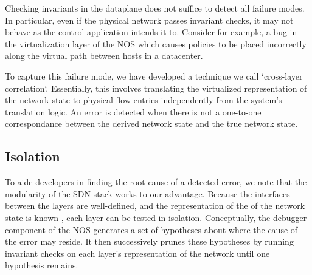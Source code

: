 Checking invariants in the dataplane does not suffice to detect all failure modes. In
particular, even if the physical network passes invariant checks, it may not behave as
the control application intends it to. Consider for example, a bug in the
virtualization layer of the NOS which causes policies to be placed
incorrectly along the virtual path between hosts in a datacenter.

To capture this failure mode, we have developed a technique we call `cross-layer
correlation`. Essentially, this involves translating the
virtualized representation of the network state to physical flow entries
independently from the system's translation logic. An error is detected when
there is not a one-to-one correspondance between the derived network
state and the true network state.


\subsection{Isolation}
\label{sec:isolation}

To aide developers in finding the root cause of a detected error, we note that
the modularity of the SDN stack works to our advantage. Because the interfaces
between the layers are well-defined, and the representation of the 
of the network state is known \apriori, each layer can be tested in
isolation. Conceptually, the debugger component of the NOS generates a set of hypotheses about
where the cause of the error may reside. It then successively prunes these
hypotheses by running invariant checks on each layer's representation of the
network until one hypothesis remains.
